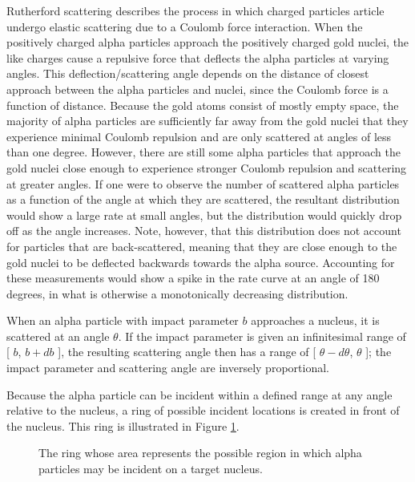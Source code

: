 \documentclass[a4paper]{article}
\begin{document}
\qq Rutherford scattering describes the process in which charged particles
article undergo elastic scattering due to a Coulomb force interaction. When the
positively charged alpha particles approach the positively charged gold nuclei,
the like charges cause a repulsive force that deflects the alpha particles at
varying angles. This deflection/scattering angle depends on the distance of
closest approach between the alpha particles and nuclei, since the Coulomb force
is a function of distance. Because the gold atoms consist of mostly empty space,
the majority of alpha particles are sufficiently far away from the gold nuclei
that they experience minimal Coulomb repulsion and are only scattered at angles
of less than one degree. However, there are still some alpha particles that
approach the gold nuclei close enough to experience stronger Coulomb repulsion
and scattering at greater angles. If one were to observe the number of scattered
alpha particles as a function of the angle at which they are scattered, the
resultant distribution would show a large rate at small angles, but the
distribution would quickly drop off as the angle increases. Note, however, that
this distribution does not account for particles that are back-scattered,
meaning that they are close enough to the gold nuclei to be deflected backwards
towards the alpha source. Accounting for these measurements would show a spike
in the rate curve at an angle of 180 degrees, in what is otherwise a
monotonically decreasing distribution.

\qq When an alpha particle with impact parameter \( b \) approaches a nucleus,
it is scattered at an angle \( \theta \). If the impact parameter is given an
infinitesimal range of [ \( b \), \( b + db \) ], the resulting scattering angle
then has a range of [ \( \theta - d\theta \), \( \theta \) ]; the impact
parameter and scattering angle are inversely proportional. 

\qq Because the alpha particle can be incident within a defined range at any
angle relative to the nucleus, a ring of possible incident locations is created
in front of the nucleus. This ring is illustrated in Figure
\ref{fig:crossSecRing}.

\begin{figure}[H]
  \begin{center}
  \end{center}
  \caption{The ring whose area represents the possible region in which alpha
    particles may be incident on a target nucleus.}
  \label{fig:crossSecRing}
\end{figure}
\end{document}
